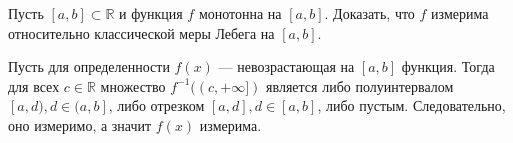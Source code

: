 \begin{task}{7}
Пусть $[a, b] \subset \mathbb{R}$ и функция $f$ монотонна на $[a, b]$. Доказать, что $f$ измерима относительно классической меры Лебега на $[a, b]$.
\end{task}

\begin{solution}
Пусть для определенности $f(x)$ --- невозрастающая на $[a, b]$ функция. Тогда для всех $c \in \mathbb{R}$ множество $f^{-1}((c, +\infty])$ является либо полуинтервалом $[a, d), d \in (a, b]$, либо отрезком $[a, d], d \in [a, b]$, либо пустым. Следовательно, оно измеримо, а значит $f(x)$ измерима.
\end{solution}